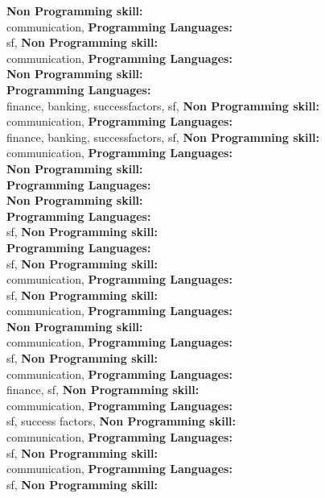 \textbf{Non Programming skill:} \\
communication, \textbf{Programming Languages:} \\
sf, \textbf{Non Programming skill:} \\
communication, \textbf{Programming Languages:} \\
\textbf{Non Programming skill:} \\
\textbf{Programming Languages:} \\
finance, banking, successfactors, sf, \textbf{Non Programming skill:} \\
communication, \textbf{Programming Languages:} \\
finance, banking, successfactors, sf, \textbf{Non Programming skill:} \\
communication, \textbf{Programming Languages:} \\
\textbf{Non Programming skill:} \\
\textbf{Programming Languages:} \\
\textbf{Non Programming skill:} \\
\textbf{Programming Languages:} \\
sf, \textbf{Non Programming skill:} \\
\textbf{Programming Languages:} \\
sf, \textbf{Non Programming skill:} \\
communication, \textbf{Programming Languages:} \\
sf, \textbf{Non Programming skill:} \\
communication, \textbf{Programming Languages:} \\
\textbf{Non Programming skill:} \\
communication, \textbf{Programming Languages:} \\
sf, \textbf{Non Programming skill:} \\
communication, \textbf{Programming Languages:} \\
finance, sf, \textbf{Non Programming skill:} \\
communication, \textbf{Programming Languages:} \\
sf, success factors, \textbf{Non Programming skill:} \\
communication, \textbf{Programming Languages:} \\
sf, \textbf{Non Programming skill:} \\
communication, \textbf{Programming Languages:} \\
sf, \textbf{Non Programming skill:} \\
